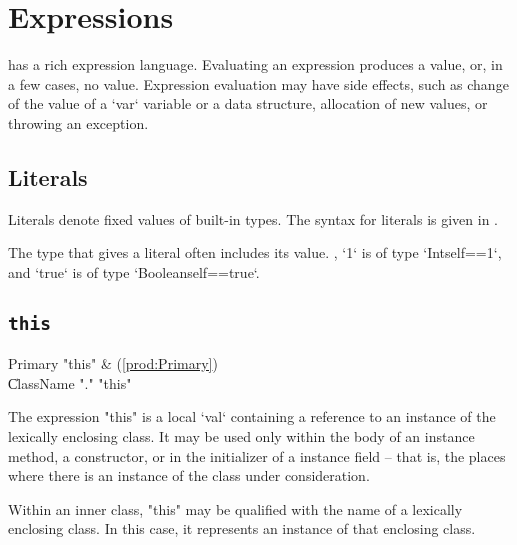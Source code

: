  \chapter{Expressions}\label{XtenExpressions}

\Xten{} has a rich expression language.
Evaluating an expression produces a value, or, in a few cases, no value. 
Expression evaluation may have side effects, such as change of the value of a 
\xcd`var` variable or a data structure, allocation of new values, or throwing
an exception. 



\section{Literals}

Literals denote fixed values of built-in types. 
The syntax for literals is given in . 

The type that \Xten{} gives a literal often includes its value. \Eg, \xcd`1`
is of type \xcd`Int{self==1}`, and \xcd`true` is of type
\xcd`Boolean{self==true}`.

\section{{\tt this}}

\begin{bbgrammar}
             Primary \: \xcd"this" & (\ref{prod:Primary}) \\
                    \| ClassName \xcd"." \xcd"this" \\
\end{bbgrammar}


The expression \xcd"this" is a  local \xcd`val` containing a reference
to an instance of the lexically enclosing class.
It may be used only within the body of an instance method, a
constructor, or in the initializer of a instance field -- that is, the places
where there is an instance of the class under consideration.

Within an inner class, \xcd"this" may be qualified with the
name of a lexically enclosing class.  In this case, it
represents an instance of that enclosing class.  


